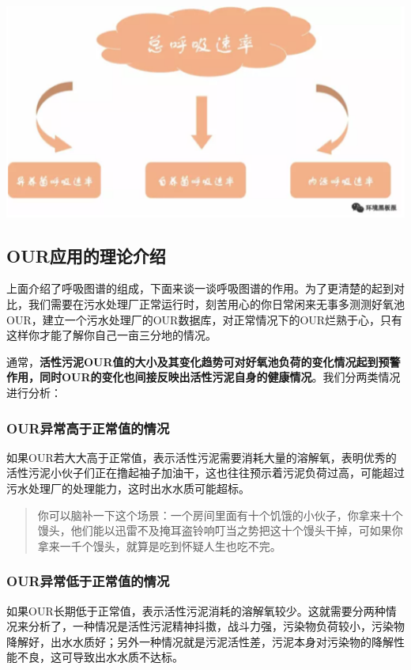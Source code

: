 \documentclass[]{book}
\begin{document}
\includegraphics[width=6.67in]{images/os2}

\subsection{OUR应用的理论介绍}\label{our}

上面介绍了呼吸图谱的组成，下面来谈一谈呼吸图谱的作用。为了更清楚的起到对比，我们需要在污水处理厂正常运行时，刻苦用心的你日常闲来无事多测测好氧池OUR，建立一个污水处理厂的OUR数据库，对正常情况下的OUR烂熟于心，只有这样你才能了解你自己一亩三分地的情况。

通常，\textbf{活性污泥OUR值的大小及其变化趋势可对好氧池负荷的变化情况起到预警作用，同时OUR的变化也间接反映出活性污泥自身的健康情况}。我们分两类情况进行分析：

\subsubsection{OUR异常高于正常值的情况}\label{our}

如果OUR若大大高于正常值，表示活性污泥需要消耗大量的溶解氧，表明优秀的活性污泥小伙子们正在撸起袖子加油干，这也往往预示着污泥负荷过高，可能超过污水处理厂的处理能力，这时出水水质可能超标。

\begin{quote}
你可以脑补一下这个场景：一个房间里面有十个饥饿的小伙子，你拿来十个馒头，他们能以迅雷不及掩耳盗铃响叮当之势把这十个馒头干掉，可如果你拿来一千个馒头，就算是吃到怀疑人生也吃不完。
\end{quote}

\subsubsection{OUR异常低于正常值的情况}\label{our}

如果OUR长期低于正常值，表示活性污泥消耗的溶解氧较少。这就需要分两种情况来分析了，一种情况是活性污泥精神抖擞，战斗力强，污染物负荷较小，污染物降解好，出水水质好；另外一种情况就是污泥活性差，污泥本身对污染物的降解性能不良，这可导致出水水质不达标。
\end{document}
